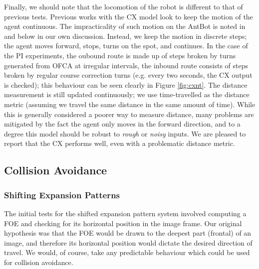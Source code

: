 \documentclass[a4paper,11pt,twoside,openright]{article}
\begin{document}
Finally,  we should note that the locomotion of the robot is different to that of
previous tests. Previous works with the CX model look to keep the motion of the
agent continuous. The impracticality of such motion on the AntBot is noted in
\cite{Mitchell2018} and below in our own discussion. Instead, we keep the motion
in discrete steps; the agent moves forward, stops, turns on the spot, and
continues. In the case of the PI experiments, the oubound route is made up of
steps broken by turns generated from OFCA at irregular intervals, the inbound
route consists of steps broken by regular course correction turns (e.g. every two
seconds, the CX output is checked); this behaviour can be seen 
clearly in Figure \ref{fig:cxnt}. The distance measurement is still updated
continuously; we use time-travelled as the distance metric (assuming we
travel the same distance in the same amount of time). While this is generally
considered a poorer way to measure distance, many problems are mitigated by the
fact the agent only moves in the forward direction, and to a degree this model
should be robust to \textit{rough} or \textit{noisy} inputs. We are pleased to
report that the CX performs well, even with a problematic distance metric.

\subsection{Collision Avoidance}
\subsubsection{Shifting Expansion Patterns}
The initial tests for the shifted expansion pattern system involved computing
a FOE and checking for its horizontal position in the image frame. Our
original hypothesis was that the FOE would be drawn
to the deepest part (frontal) of an image, and therefore its horizontal position
would dictate the desired direction of travel. We would, of course, take any
predictable behaviour which could be used for collision avoidance.
\newline\par
\end{document}

